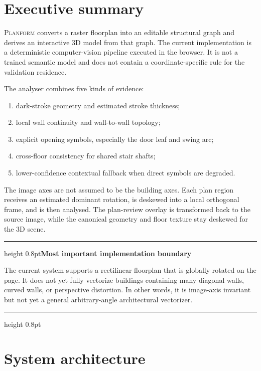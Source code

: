 \documentclass[11pt,a4paper]{article}
\newcommand{\Planform}{\textsc{Planform}}
\newenvironment{keybox}[1]{
  \par\medskip\noindent\begin{minipage}{\textwidth}
  \color{Blue}\hrule height 0.8pt\vspace{1.6mm}\textbf{#1}\par\smallskip\color{Ink}
}{
  \vspace{1.3mm}\color{Blue}\hrule height 0.8pt\end{minipage}\par\medskip
}
\begin{document}
\hypersetup{pageanchor=true}
\section*{Executive summary}

\Planform{} converts a raster floorplan into an editable structural graph and derives an interactive 3D model from that graph. The current implementation is a deterministic computer-vision pipeline executed in the browser. It is not a trained semantic model and does not contain a coordinate-specific rule for the validation residence.

The analyser combines five kinds of evidence:

\begin{enumerate}
  \item dark-stroke geometry and estimated stroke thickness;
  \item local wall continuity and wall-to-wall topology;
  \item explicit opening symbols, especially the door leaf and swing arc;
  \item cross-floor consistency for shared stair shafts;
  \item lower-confidence contextual fallback when direct symbols are degraded.
\end{enumerate}

The image axes are not assumed to be the building axes. Each plan region receives an estimated dominant rotation, is deskewed into a local orthogonal frame, and is then analysed. The plan-review overlay is transformed back to the source image, while the canonical geometry and floor texture stay deskewed for the 3D scene.

\begin{keybox}{Most important implementation boundary}
The current system supports a rectilinear floorplan that is globally rotated on the page. It does not yet fully vectorize buildings containing many diagonal walls, curved walls, or perspective distortion. In other words, it is image-axis invariant but not yet a general arbitrary-angle architectural vectorizer.
\end{keybox}

\tableofcontents
\listoffigures
\clearpage
{}

\section{System architecture}
\end{document}
